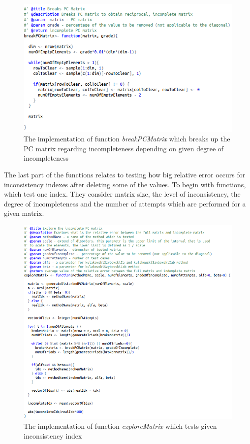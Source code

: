 \begin{figure}[h]
\centerline{\includegraphics[scale=0.73]{images/kod13.png}}
\caption{The implementation of function \textit{breakPCMatrix} which breaks up the PC matrix regarding incompleteness depending on given degree of incompleteness}
\label{fig:rstudio}
\end{figure}

The last part of the functions relates to testing how big relative error occurs for inconsistency indexes after deleting some of the values. To begin with functions, which test one index. They consider matrix size, the level of inconsistency, the degree of incompleteness and the number of attempts which are performed for a given matrix.

\begin{figure}[h]
\centerline{\includegraphics[scale=0.58]{images/kod21.png}}
\caption{The implementation of function \textit{exploreMatrix} which tests given inconsistency index}
\label{fig:rstudio}
\end{figure}

